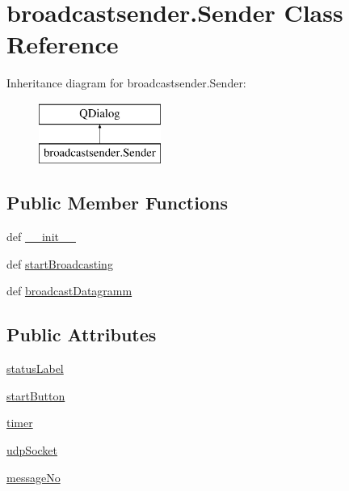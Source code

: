 \hypertarget{classbroadcastsender_1_1Sender}{}\section{broadcastsender.\+Sender Class Reference}
\label{classbroadcastsender_1_1Sender}
Inheritance diagram for broadcastsender.\+Sender\+:\begin{figure}[H]
\begin{center}
\leavevmode
\includegraphics[height=2.000000cm]{classbroadcastsender_1_1Sender}
\end{center}
\end{figure}
\subsection*{Public Member Functions}
\begin{DoxyCompactItemize}
\item 
def \hyperlink{classbroadcastsender_1_1Sender_aafbfdefb767dff186f33396f7bff74e4}{\+\_\+\+\_\+init\+\_\+\+\_\+}
\item 
def \hyperlink{classbroadcastsender_1_1Sender_a4ab5ac29800b415475944cc84a62f085}{start\+Broadcasting}
\item 
def \hyperlink{classbroadcastsender_1_1Sender_a42b67eec07e02898db68b248d9257a9a}{broadcast\+Datagramm}
\end{DoxyCompactItemize}
\subsection*{Public Attributes}
\begin{DoxyCompactItemize}
\item 
\hyperlink{classbroadcastsender_1_1Sender_a53237c363977ab9d02fafd1e7516fdc4}{status\+Label}
\item 
\hyperlink{classbroadcastsender_1_1Sender_a8fa5d08be57c29615f5089d8a60c37eb}{start\+Button}
\item 
\hyperlink{classbroadcastsender_1_1Sender_aab7b7c43cd8b7ac203170a3425a74930}{timer}
\item 
\hyperlink{classbroadcastsender_1_1Sender_a63ab35ba16188f340762ad6f8f4f17af}{udp\+Socket}
\item 
\hyperlink{classbroadcastsender_1_1Sender_ac33016ef6c8c52f9b43b46370a128648}{message\+No}
\end{DoxyCompactItemize}


